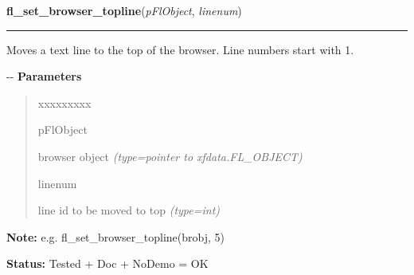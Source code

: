 \hspace{.8\funcindent}\begin{boxedminipage}{\funcwidth}

    \raggedright \textbf{fl\_set\_browser\_topline}(\textit{pFlObject}, \textit{linenum})

    \vspace{-1.5ex}

    \rule{\textwidth}{0.5\fboxrule}
\setlength{\parskip}{2ex}

Moves a text line to the top of the browser. Line numbers start with 1.

-{}-
\setlength{\parskip}{1ex}
      \textbf{Parameters}
      \vspace{-1ex}

      \begin{quote}
        \begin{Ventry}{xxxxxxxxx}

          \item[pFlObject]


browser object
            {\it (type=pointer to xfdata.FL\_OBJECT)}

          \item[linenum]


line id to be moved to top
            {\it (type=int)}

        \end{Ventry}

      \end{quote}

\textbf{Note:} 
e.g. fl\_set\_browser\_topline(brobj, 5)


\textbf{Status:} 
Tested + Doc + NoDemo = OK


    \end{boxedminipage}

    \label{xformslib:flbrowser:fl_set_browser_bottomline}

    \vspace{0.5ex}

